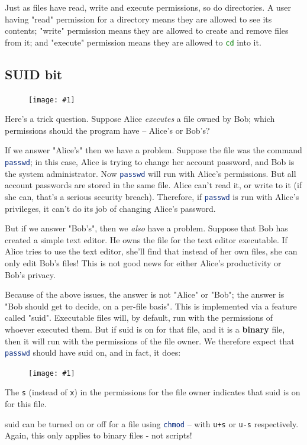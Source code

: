 \documentclass{article}
\newcommand{\displayimage}[1] {
\begin{figure}[H]
    \centering
    \texttt{[image: \#1]} 
\end{figure}
}
\newcommand{\wrapimageright}[1] {
    \begin{figure}
        \begin{center}
            \texttt{[image: \#1]} 
        \end{center}
    \end{figure}
}
\newcommand{\xcode}[2]{\colorbox{ubuntuback}{\lstinline[language=#1]|#2|}}
\begin{document}
Just as files have read, write and execute permissions, so do directories. A user having "read" permission for a directory means they are allowed to see its contents; "write" permission means they are allowed to create and remove files from it; and "execute" permission means they are allowed to \xcode{bash}{cd} into it.

\subsection{SUID bit}

\wrapimageright{./images/baton.png}
Here's a trick question. Suppose Alice \textit{executes} a file owned by Bob; which permissions should the program have -- Alice's or Bob's?

If we answer "Alice's" then we have a problem. Suppose the file was the command \xcode{bash}{passwd}; in this case, Alice is trying to change her account password, and Bob is the system administrator. Now \xcode{bash}{passwd} will run with Alice's permissions. But all account passwords are stored in the same file. Alice can't read it, or write to it (if she can, that's a serious security breach). Therefore, if \xcode{bash}{passwd} is run with Alice's privileges, it can't do its job of changing Alice's password.

But if we answer "Bob's", then we \textit{also} have a problem. Suppose that Bob has created a simple text editor. He owns the file for the text editor executable. If Alice tries to use the text editor, she'll find that instead of her own files, she can only edit Bob's files! This is not good news for either Alice's productivity or Bob's privacy. 

Because of the above issues, the answer is not "Alice" or "Bob"; the answer is "Bob should get to decide, on a per-file basis". This is implemented via a feature called "suid". Executable files will, by default, run with the permissions of whoever executed them. But if suid is on for that file, and it is a \textbf{binary} file, then it will run with the permissions of the file owner. We therefore expect that \xcode{bash}{passwd} should have suid on, and in fact, it does:

\displayimage{./images/suid_passwd.png}


The \xcode{bash}{s} (instead of \xcode{bash}{x}) in the permissions for the file owner indicates that suid is on for this file. 

suid can be turned on or off for a file using \xcode{bash}{chmod} -- with \xcode{bash}{u+s} or \xcode{bash}{u-s} respectively. Again, this only applies to binary files - not scripts!
\end{document}
